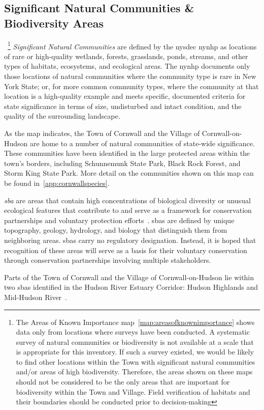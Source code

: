 \subsection*{Significant Natural Communities \& Biodiversity Areas}~\footnote{The 
Areas of Known Importance map~\ref{map:areasofknownimportance} shows data only 
from locations where surveys have been conducted. A systematic survey of natural 
communities or biodiversity is not available at a scale that is appropriate for 
this inventory. If such a survey existed, we would be likely to find other 
locations within the Town with significant natural communities and/or areas of 
high biodiversity. Therefore, the areas shown on these maps should not be 
considered to be the only areas that are important for biodiversity within the 
Town and Village. Field verification of habitats and their boundaries should be 
conducted prior to decision-making} \textit{Significant Natural Communities} are 
defined by the \gls{nysdec} \gls{nynhp} as locations of rare or high-quality 
wetlands, forests, grasslands, ponds, streams, and other types of habitats, 
ecosystems, and ecological areas. The \gls{nynhp} documents only those locations 
of natural communities where the community type is rare in New York State; or, 
for more common community types, where the community at that location is a 
high-quality example and meets specific, documented criteria for state 
significance in terms of size, undisturbed and intact condition, and the quality 
of the surrounding landscape.
\par
As the map indicates, the Town of Cornwall and the Village of
Cornwall-on-Hudson are home to a number of natural communities of state-wide
significance. These communities have been identified in the large protected
areas within the town's borders, including Schunnemunk State Park, Black Rock
Forest, and Storm King State Park. More detail on the communities shown on this
map can be found in~\ref{app:cornwallspecies}. 
\par
\textit{\gls{sba}} are areas that contain high concentrations of biological diversity or
unusual ecological features that contribute to and serve as a framework for
conservation partnerships and voluntary protection efforts~\citep{haeckel2014}.
\gls{sba}s are defined by unique topography, geology, hydrology, and biology
that distinguish them from neighboring areas. \gls{sba}s carry no regulatory
designation. Instead, it is hoped that recognition of these areas will serve as
a basis for their voluntary conservation through conservation partnerships
involving multiple stakeholders.
\par
Parts of the Town of Cornwall and the Village of Cornwall-on-Hudson lie within
two \gls{sba}s identified in the Hudson River Estuary Corridor: Hudson
Highlands and Mid-Hudson River~\citep{penhollow2006}.
